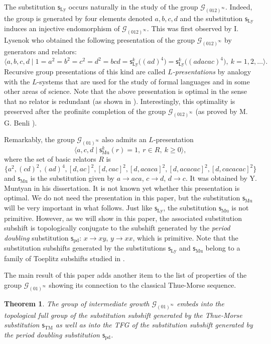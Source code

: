 \documentclass[12pt]{article}
\newtheorem{theorem}{Theorem}[section]
\theoremstyle{definition}
\def\cG{\mathcal{G}}
\def\subst{\mathsf{s}}
\def\TM{\subst_{\mathrm{TM}}}
\def\pd{\subst_{\mathrm{pd}}}
\def\sub{\subst_{\mathrm{Mu}}}
\begin{document}
The substitution $\subst_{\mathrm{Ly}}$ occurs naturally in the study of 
the group $\cG_{(012)^\infty}$.  Indeed, the group is generated by four 
elements denoted $a,b,c,d$ and the substitution $\subst_{\mathrm{Ly}}$ 
induces an injective endomorphism of $\cG_{(012)^\infty}$.  This was first 
observed by I. Lysenok \cite{Lys85} who obtained the following  
presentation of the group $\cG_{(012)^\infty}$ by generators and relators:
\[
\bigl\langle a,b,c,d \mid 1=a^2=b^2=c^2=d^2=bcd
=\subst_{\mathrm{Ly}}^k\bigl((ad)^4\bigr)
=\subst_{\mathrm{Ly}}^k\bigl((adacac)^4\bigr), \ k=1,2,\dots \bigr\rangle.
\]
Recursive group presentations of this kind are called 
\emph{$L$-presentations} by analogy with the $L$-systems that are used for 
the study of formal languages and in some other areas of science.  Note 
that the above presentation is optimal in the sense that no relator is 
redundant (as shown in \cite{Grig99}).  Interestingly, this optimality is 
preserved after the profinite completion of the group $\cG_{(012)^\infty}$ 
(as proved by M. G. Benli \cite{Benli}).

Remarkably, the group $\cG_{(01)^\infty}$ also admits an $L$-presentation  
\[
\bigl\langle a,c,d \mid \sub^k(r)=1, \ r\in R, \ k\ge0 \bigr\rangle,
\]
where the set of basic relators $R$ is
\[
\{a^2,(cd)^2,(ad)^4,[d,ac]^2,[d,cac]^2,[d,acaca]^2,
[d,acacac]^2,[d,cacacac]^2\}
\]
and $\sub$ is the substitution given by $a\to aca$, $c\to d$, $d\to c$.  
It was obtained by Y. Muntyan \cite{Muntyan} in his dissertation.  It is 
not known yet whether this presentation is optimal.  We do not need the 
presentation in this paper, but the substitution $\sub$ will be very 
important in what follows.  Just like $\subst_{\mathrm{Ly}}$, the 
substitution $\sub$ is not primitive.  However, as we will show in this 
paper, the associated substitution subshift is topologically conjugate to 
the subshift generated by the \emph{period doubling} substitution $\pd$: 
$x\to xy$, $y\to xx$, which is primitive.  Note that the substitution 
subshifts generated by the substitutions $\subst_{\mathrm{Ly}}$ and $\sub$ 
belong to a family of Toeplitz subshifts studied in \cite{Vor10}.

The main result of this paper adds another item to the list of properties 
of the group $\cG_{(01)^\infty}$ showing its connection to the classical 
Thue-Morse sequence.

\begin{theorem}\label{main}
The group of intermediate growth $\cG_{(01)^\infty}$ embeds into the 
topological full group of the substitution subshift generated by the 
Thue-Morse substitution $\TM$ as well as into the TFG of the substitution 
subshift generated by the period doubling substitution $\pd$.  
\end{theorem}
\end{document}
